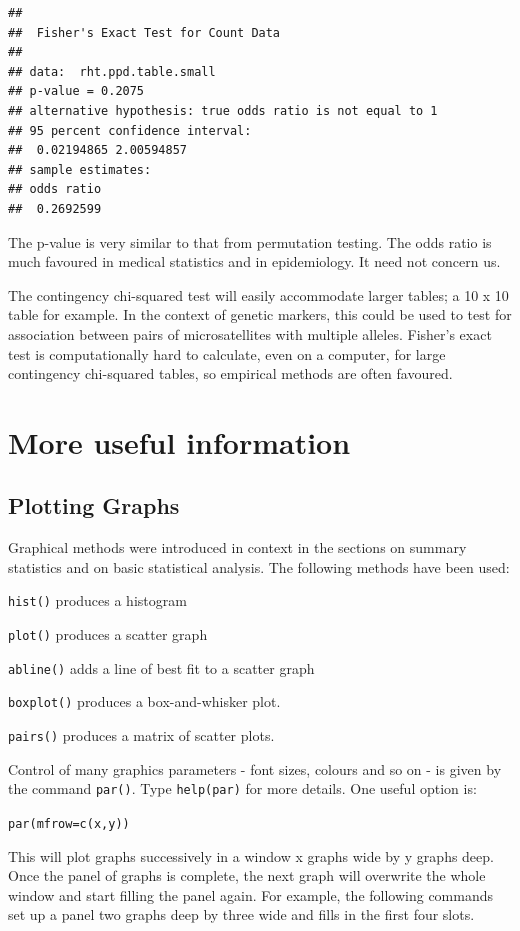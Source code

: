 \documentclass[
]{book}
\begin{document}
\begin{verbatim}
## 
##  Fisher's Exact Test for Count Data
## 
## data:  rht.ppd.table.small
## p-value = 0.2075
## alternative hypothesis: true odds ratio is not equal to 1
## 95 percent confidence interval:
##  0.02194865 2.00594857
## sample estimates:
## odds ratio 
##  0.2692599
\end{verbatim}

The p-value is very similar to that from permutation testing. The odds ratio is much favoured in medical statistics and in epidemiology. It need not concern us.

The contingency chi-squared test will easily accommodate larger tables; a 10 x 10 table for example. In the context of genetic markers, this could be used to test for association between pairs of microsatellites with multiple alleles. Fisher's exact test is computationally hard to calculate, even on a computer, for large contingency chi-squared tables, so empirical methods are often favoured.

\hypertarget{more-useful-information}{%
\section{More useful information}\label{more-useful-information}}

\hypertarget{plotting-graphs}{%
\subsection{Plotting Graphs}\label{plotting-graphs}}

Graphical methods were introduced in context in the sections on summary statistics and on basic statistical analysis. The following methods have been used:

\texttt{hist()} produces a histogram

\texttt{plot()} produces a scatter graph

\texttt{abline()} adds a line of best fit to a scatter graph

\texttt{boxplot()} produces a box-and-whisker plot.

\texttt{pairs()} produces a matrix of scatter plots.

Control of many graphics parameters - font sizes, colours and so on - is given by the command \texttt{par()}. Type \texttt{help(par)} for more details. One useful option is:

\texttt{par(mfrow=c(x,y))}

This will plot graphs successively in a window x graphs wide by y graphs deep. Once the panel of graphs is complete, the next graph will overwrite the whole window and start filling the panel again. For example, the following commands set up a panel two graphs deep by three wide and fills in the first four slots.
\end{document}

